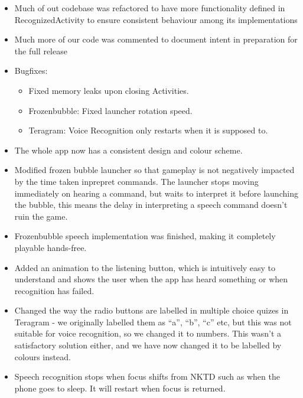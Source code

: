 \documentclass[11pt, oneside]{article}
\begin{document}
\begin{itemize}

\item Much of out codebase was refactored to have more functionality defined in RecognizedActivity to ensure consistent behaviour among its implementations

\item Much more of our code was commented to document intent in preparation for the full release

\item Bugfixes:
\begin{itemize}
	\item Fixed memory leaks upon closing Activities.
	\item Frozenbubble: Fixed launcher rotation speed.
	\item Teragram: Voice Recognition only restarts when it is
          supposed to.
\end{itemize}

\item The whole app now has a consistent design and colour scheme.

\item Modified frozen bubble launcher so that gameplay is not
  negatively impacted by the time taken inprepret commands. The
  launcher stops moving immediately on hearing a command, but waits to
  interpret it before launching the bubble, this means the delay in
  interpreting a speech command doesn't ruin the game.

\item Frozenbubble speech implementation was finished, making it
  completely playable hands-free.

\item Added an animation to the listening button, which is intuitively
  easy to understand and shows the user when the app has heard
  something or when recognition has failed.

\item Changed the way the radio buttons are labelled in multiple
  choice quizes in Teragram - we originally labelled them as ``a'',
  ``b'', ``c'' etc, but this was not suitable for voice recognition,
  so we changed it to numbers. This wasn't a satisfactory solution
  either, and we have now changed it to be labelled by colours
  instead.

\item Speech recognition stops when focus shifts from NKTD such as
  when the phone goes to sleep. It will restart when focus is returned.
\end{itemize}
\end{document}
